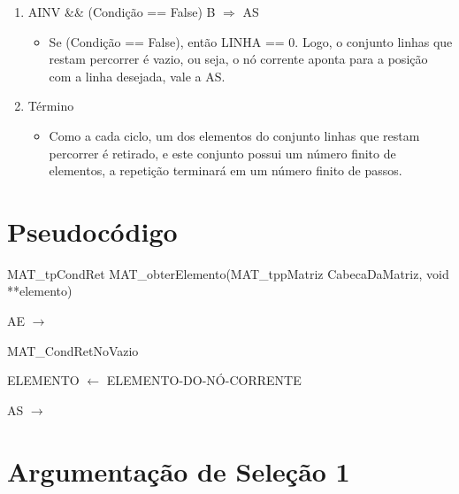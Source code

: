 \documentclass[a4paper,12pt,oneside]{book}
\begin{document}
\begin{enumerate}[label=\protect\circled{\arabic*}]
    \item AINV \&\& (Condição == False) \circled{+} B $\Longrightarrow$ AS

          \begin{itemize}
              \item Se (Condição == False), então LINHA == 0. Logo, o conjunto linhas que restam percorrer é vazio, ou seja, o nó corrente aponta para a posição com a linha desejada, vale a AS.
          \end{itemize}

    \item Término

          \begin{itemize}
              \item Como a cada ciclo, um dos elementos do conjunto linhas que restam percorrer é retirado, e este conjunto possui um número finito de elementos, a repetição terminará em um número finito de passos.
          \end{itemize}

\end{enumerate}

\chapter{Pseudocódigo}

\begin{algorithm}[h]

    \caption{MAT\_tpCondRet MAT\_obterElemento(MAT\_tppMatriz CabecaDaMatriz, void **elemento)}

    \SetAlgoLined
    AE $\longrightarrow$

    \Indp\Inicio
    {

        {

            \Retorna MAT\_CondRetNoVazio
        }

        ELEMENTO $\longleftarrow$ ELEMENTO-DO-NÓ-CORRENTE


    }

    \Indm AS $\longrightarrow$

\end{algorithm}

\chapter{Argumentação de Seleção 1}
\end{document}
